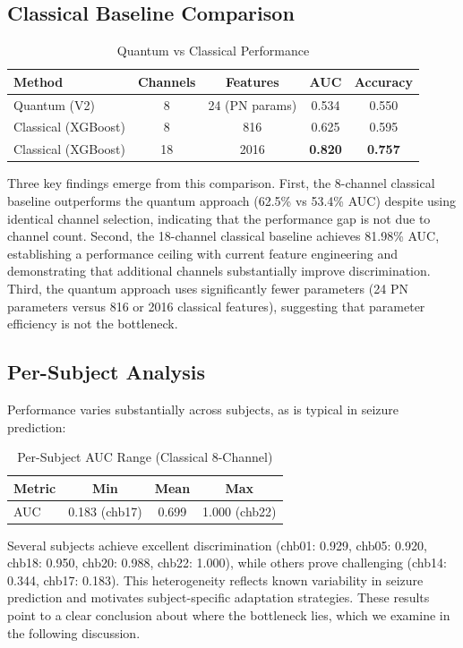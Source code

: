 \documentclass[11pt,a4paper]{article}
\begin{document}
\subsection{Classical Baseline Comparison}

\begin{table}[htbp]
\centering
\caption{Quantum vs Classical Performance}
\label{tab:qvc}
\begin{tabular}{lcccc}
\toprule
Method & Channels & Features & AUC & Accuracy \\
\midrule
Quantum (V2) & 8 & 24 (PN params) & 0.534 & 0.550 \\
Classical (XGBoost) & 8 & 816 & 0.625 & 0.595 \\
Classical (XGBoost) & 18 & 2016 & \textbf{0.820} & \textbf{0.757} \\
\bottomrule
\end{tabular}
\end{table}

Three key findings emerge from this comparison. First, the 8-channel classical baseline outperforms the quantum approach (62.5\% vs 53.4\% AUC) despite using identical channel selection, indicating that the performance gap is not due to channel count. Second, the 18-channel classical baseline achieves 81.98\% AUC, establishing a performance ceiling with current feature engineering and demonstrating that additional channels substantially improve discrimination. Third, the quantum approach uses significantly fewer parameters (24 PN parameters versus 816 or 2016 classical features), suggesting that parameter efficiency is not the bottleneck.

\subsection{Per-Subject Analysis}

Performance varies substantially across subjects, as is typical in seizure prediction:

\begin{table}[htbp]
\centering
\caption{Per-Subject AUC Range (Classical 8-Channel)}
\label{tab:persubject}
\begin{tabular}{lccc}
\toprule
Metric & Min & Mean & Max \\
\midrule
AUC & 0.183 (chb17) & 0.699 & 1.000 (chb22) \\
\bottomrule
\end{tabular}
\end{table}

Several subjects achieve excellent discrimination (chb01: 0.929, chb05: 0.920, chb18: 0.950, chb20: 0.988, chb22: 1.000), while others prove challenging (chb14: 0.344, chb17: 0.183). This heterogeneity reflects known variability in seizure prediction and motivates subject-specific adaptation strategies. These results point to a clear conclusion about where the bottleneck lies, which we examine in the following discussion.
\end{document}

